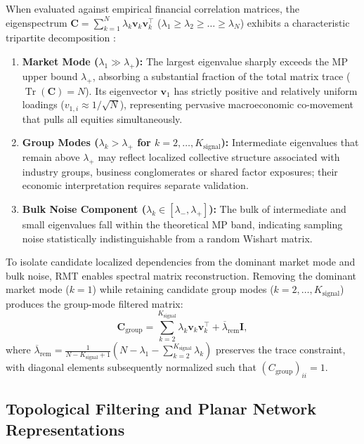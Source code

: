 When evaluated against empirical financial correlation matrices, the eigenspectrum $\mathbf{C} = \sum_{k=1}^N \lambda_k \mathbf{v}_k \mathbf{v}_k^{\top}$ ($\lambda_1 \ge \lambda_2 \ge \dots \ge \lambda_N$) exhibits a characteristic tripartite decomposition \cite{plerou_2002_random,bun_2017_cleaning}:
\begin{enumerate}
  \item \textbf{Market Mode ($\lambda_1 \gg \lambda_+$):} The largest eigenvalue sharply exceeds the MP upper bound $\lambda_+$, absorbing a substantial fraction of the total matrix trace ($\operatorname{Tr}(\mathbf{C}) = N$). Its eigenvector $\mathbf{v}_1$ has strictly positive and relatively uniform loadings ($v_{1,i} \approx 1/\sqrt{N}$), representing pervasive macroeconomic co-movement that pulls all equities simultaneously.
  \item \textbf{Group Modes ($\lambda_k > \lambda_+$ for $k = 2, \dots, K_{\mathrm{signal}}$):} Intermediate eigenvalues that remain above $\lambda_+$ may reflect localized collective structure associated with industry groups, business conglomerates or shared factor exposures; their economic interpretation requires separate validation.
  \item \textbf{Bulk Noise Component ($\lambda_k \in [\lambda_-, \lambda_+]$):} The bulk of intermediate and small eigenvalues fall within the theoretical MP band, indicating sampling noise statistically indistinguishable from a random Wishart matrix.
\end{enumerate}

To isolate candidate localized dependencies from the dominant market mode and bulk noise, RMT enables spectral matrix reconstruction. Removing the dominant market mode ($k=1$) while retaining candidate group modes ($k = 2, \dots, K_{\mathrm{signal}}$) produces the group-mode filtered matrix:
\begin{equation}
\mathbf{C}_{\mathrm{group}} = \sum_{k=2}^{K_{\mathrm{signal}}} \lambda_k \mathbf{v}_k \mathbf{v}_k^{\top} + \overline{\lambda}_{\mathrm{rem}} \mathbf{I},
\label{eq:theory_c_group}
\end{equation}
where $\overline{\lambda}_{\mathrm{rem}} = \frac{1}{N - K_{\mathrm{signal}} + 1} \left( N - \lambda_1 - \sum_{k=2}^{K_{\mathrm{signal}}} \lambda_k \right)$ preserves the trace constraint, with diagonal elements subsequently normalized such that $(C_{\mathrm{group}})_{ii} = 1$.

\subsection{Topological Filtering and Planar Network Representations}
\label{subsec:theory_networks}

